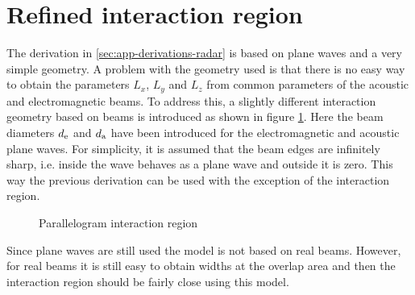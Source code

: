 \documentclass[11pt,twoside]{eitExjobb}
\begin{document}
	\section{Refined interaction region} \label{sec:app-derivations-refined}
	The derivation in \ref{sec:app-derivations-radar} is based on plane waves and a very simple geometry. A problem with the geometry used is that there is no easy way to obtain the parameters $L_{x}$, $L_{y}$ and $L_{z}$ from common parameters of the acoustic and electromagnetic beams. To address this, a slightly different interaction geometry based on beams is introduced as shown in figure \ref{fig:parallelogram}. Here the beam diameters $d_{\mathrm{e}}$ and $d_{\mathrm{a}}$ have been introduced for the electromagnetic and acoustic plane waves. For simplicity, it is assumed that the beam edges are infinitely sharp, i.e. inside the wave behaves as a plane wave and outside it is zero. This way the previous derivation can be used with the exception of the interaction region.
	\begin{figure}[h]
		\centering
		\resizebox{\textwidth}{!}{
			
		}
		\caption{\label{fig:parallelogram} Parallelogram interaction region}
	\end{figure}
	Since plane waves are still used the model is not based on real beams. However, for real beams it is still easy to obtain widths at the overlap area and then the interaction region should be fairly close using this model.
	
\end{document}
